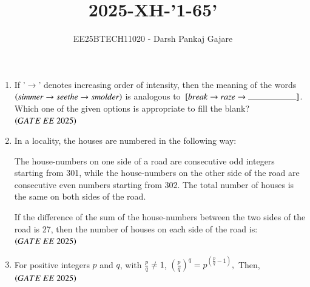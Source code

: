 \documentclass[journal,12pt,onecolumn]{IEEEtran}
\theoremstyle{remark}
\begin{document}
\title{2025-XH-'1-65'}
\author{EE25BTECH11020 - Darsh Pankaj Gajare}
\maketitle
\begin{enumerate}

\item If '$\rightarrow $' denotes increasing order of intensity, then the meaning of the words $\left(simmer \rightarrow  seethe \rightarrow  smolder\right)$ is analogous to $\sbrak{break \rightarrow  raze \rightarrow  \rule{2cm}{0.4pt} }$. Which one of the given options is appropriate to fill the blank? 
\hfill $\brak{GATE\ EE\ 2025}$
    \begin{enumerate}
  \end{enumerate}
   \item In a locality, the houses are numbered in the following way:

The house-numbers on one side of a road are consecutive odd integers starting from 301, while the house-numbers on the other side of the road are consecutive even numbers starting from 302. The total number of houses is the same on both sides of the road.

If the difference of the sum of the house-numbers between the two sides of the road is 27, then the number of houses on each side of the road is: \\
   \hfill $\brak{GATE\ EE\ 2025}$
       \begin{enumerate}
  \end{enumerate}
   \item For positive integers $ p $ and $ q $, with $ \frac{p}{q} \neq 1 $, 
$\left( \frac{p}{q} \right)^q = p^{\left( \frac{p}{q} - 1 \right)},$
Then,\\
\hfill $\brak{GATE\ EE\ 2025}$
    \begin{enumerate}
  \end{enumerate}
 

\end{enumerate}
\end{document}

